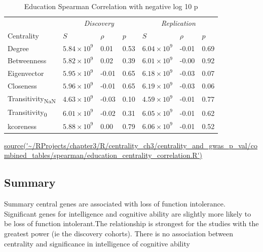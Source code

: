 \begin{table}[ht]
\centering
\setlength{\extrarowheight}{2pt}
\begin{tabular}{l@{\hskip 20pt}lll@{\hskip 20pt}lll}

  \toprule
  &  \multicolumn{3}{c}{\textit{Discovery}} & \multicolumn{3}{c}{\textit{Replication}} \\
  \cmidrule{2-7}
Centrality & $S$ & $\rho$ & $p$ & $S$ & $\rho$ & $p$ \\ 
  \midrule
Degree & $5.84 \times 10^{9}$ & 0.01 & 0.53 & $6.04 \times 10^{9}$ & -0.01 & 0.69 \\ 
  Betweenness & $5.82 \times 10^{9}$ & 0.02 & 0.39 & $6.01 \times 10^{9}$ & -0.00 & 0.92 \\ 
  Eigenvector & $5.95 \times 10^{9}$ & -0.01 & 0.65 & $6.18 \times 10^{9}$ & -0.03 & 0.07 \\ 
  Closeness & $5.96 \times 10^{9}$ & -0.01 & 0.65 & $6.19 \times 10^{9}$ & -0.03 & 0.06 \\ 
  Transitivity\textsubscript{NaN} & $4.63 \times 10^{9}$ & -0.03 & 0.10 & $4.59 \times 10^{9}$ & -0.01 & 0.77 \\ 
  Transitivity\textsubscript{0} & $6.01 \times 10^{9}$ & -0.02 & 0.31 & $6.05 \times 10^{9}$ & -0.01 & 0.62 \\ 
  kcoreness & $5.88 \times 10^{9}$ & 0.00 & 0.79 & $6.06 \times 10^{9}$ & -0.01 & 0.52 \\ 
   \bottomrule
\end{tabular}
\caption{Education Spearman Correlation with negative log 10 p}
\tiny\url{source('~/RProjects/chapter3/R/centrality_ch3/centrality_and_gwas_p_val/combined_tables/spearman/education_centrality_correlation.R')}
\label{tab:Education Spearman Correlation}
\end{table}


\clearpage

\subsection{Summary}
Summary central genes are associated with loss of function intolerance. Significant genes for intelligence and cognitive ability are slightly more likely to be loss of function intolerant.The relationship is strongest for the studies with the greatest power (ie the discovery cohorts).  There is no association between centrality and significance in intelligence of cognitive ability
\clearpage

